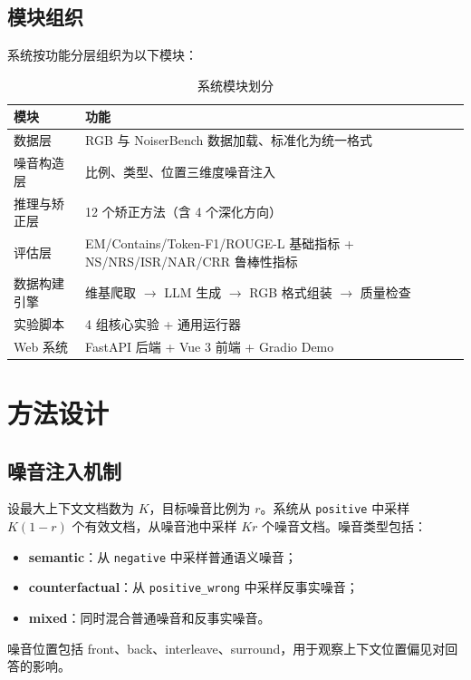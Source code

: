\documentclass[UTF8,zihao=-4]{ctexart}
\begin{document}
\subsection{模块组织}

系统按功能分层组织为以下模块：

\begin{table}[H]
  \centering
  \caption{系统模块划分}
  \begin{tabularx}{\textwidth}{lY}
    \toprule
    模块 & 功能 \\
    \midrule
    数据层 & RGB 与 NoiserBench 数据加载、标准化为统一格式 \\
    噪音构造层 & 比例、类型、位置三维度噪音注入 \\
    推理与矫正层 & 12 个矫正方法（含 4 个深化方向） \\
    评估层 & EM/Contains/Token-F1/ROUGE-L 基础指标 + NS/NRS/ISR/NAR/CRR 鲁棒性指标 \\
    数据构建引擎 & 维基爬取 $\rightarrow$ LLM 生成 $\rightarrow$ RGB 格式组装 $\rightarrow$ 质量检查 \\
    实验脚本 & 4 组核心实验 + 通用运行器 \\
    Web 系统 & FastAPI 后端 + Vue 3 前端 + Gradio Demo \\
    \bottomrule
  \end{tabularx}
\end{table}

\section{方法设计}

\subsection{噪音注入机制}
设最大上下文文档数为 $K$，目标噪音比例为 $r$。系统从 \texttt{positive} 中采样 $K(1-r)$ 个有效文档，从噪音池中采样 $Kr$ 个噪音文档。噪音类型包括：

\begin{itemize}
  \item \textbf{semantic}：从 \texttt{negative} 中采样普通语义噪音；
  \item \textbf{counterfactual}：从 \texttt{positive\_wrong} 中采样反事实噪音；
  \item \textbf{mixed}：同时混合普通噪音和反事实噪音。
\end{itemize}

噪音位置包括 front、back、interleave、surround，用于观察上下文位置偏见对回答的影响。
\end{document}
